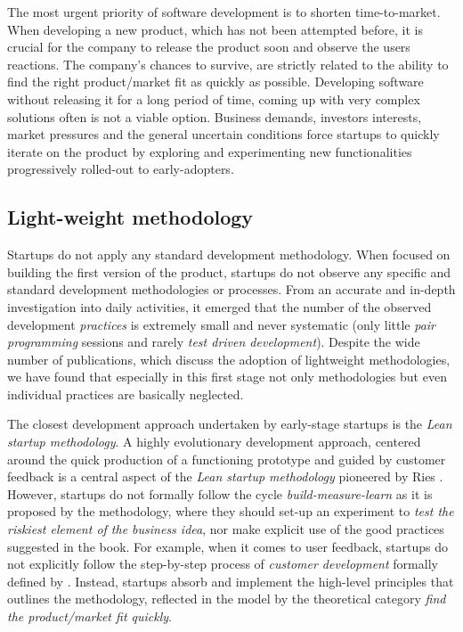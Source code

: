 \documentclass[10pt,journal,letterpaper,compsoc]{IEEEtran}
\begin{document}
The most urgent priority of software development is to shorten 
time-to-market. When developing a new product, which has not been attempted 
before, it is crucial for the company to release the product soon and observe 
the users reactions. The company's chances to survive, are strictly related to 
the ability to find the right product/market fit as quickly as possible. 
Developing software without releasing it for a long period of time, coming up 
with very complex solutions often is not a viable option. Business demands, 
investors interests, market pressures and the general uncertain conditions force 
startups to quickly iterate on the product by exploring and experimenting new 
functionalities progressively rolled-out to early-adopters.

\subsection{Light-weight methodology}
Startups do not apply any standard development methodology. When focused 
on building the first version of the product, startups do not observe any 
specific and standard development methodologies or processes.  From an accurate 
and in-depth investigation into daily activities, it emerged that the number of  
the observed development \textit{practices} is extremely small and never 
systematic (only little \textit{pair programming} sessions and rarely 
\textit{test driven development}). Despite the wide number of publications, 
which discuss the adoption of lightweight methodologies, we have found that 
especially in this first stage not only methodologies but even individual 
practices are basically neglected. 

The closest development approach undertaken by early-stage startups is 
the \textit{Lean startup methodology}.  A highly evolutionary development 
approach, centered around the quick production of a functioning prototype and 
guided by customer feedback is a central aspect of the \textit{Lean startup 
methodology} pioneered by Ries \cite{Ries2011}. However, startups do not 
formally follow the cycle \textit{build-measure-learn} as it is proposed by the 
methodology, where they should set-up an experiment to \textit{test the riskiest 
element of the business idea}, nor make explicit use of the good practices 
suggested in the book. For example, when it comes to user feedback, startups do 
not explicitly follow the step-by-step process of \textit{customer development}
formally defined by \cite{Blank2005}. Instead, startups absorb and implement 
the high-level principles that outlines the methodology, reflected in the model 
by the theoretical category \textit{find the product/market fit quickly}.
\end{document}
